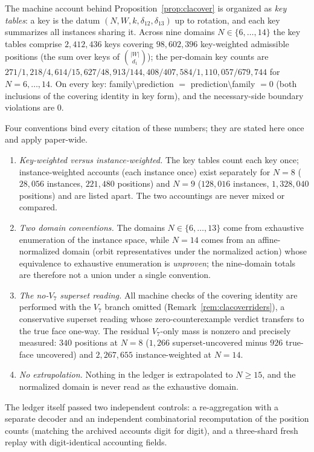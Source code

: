 The machine account behind Proposition~\ref{prop:clacover} is organized as
\emph{key tables}: a key is the datum $(N,W,k,\delta_{12},\delta_{13})$ up
to rotation, and each key summarizes all instances sharing it. Across nine
domains $N\in\{6,\dots,14\}$ the key tables comprise $2{,}412{,}436$ keys
covering $98{,}602{,}396$ key-weighted admissible positions (the sum over
keys of $\binom{|W|}{d_1}$); the per-domain key counts are
$271/1{,}218/4{,}614/15{,}627/48{,}913/144{,}408/407{,}584/1{,}110{,}057/679{,}744$
for $N=6,\dots,14$. On every key: family$\setminus$prediction $=$
prediction$\setminus$family $=0$ (both inclusions of the covering identity
in key form), and the necessary-side boundary violations are $0$.

Four conventions bind every citation of these numbers; they are stated
here once and apply paper-wide.

\begin{enumerate}[label=\textup{(\arabic*)},leftmargin=2em]
\item \emph{Key-weighted versus instance-weighted.} The key tables count
each key once; instance-weighted accounts (each instance once) exist
separately for $N=8$ ($28{,}056$ instances, $221{,}480$ positions) and $N=9$
($128{,}016$ instances, $1{,}328{,}040$ positions) and are listed apart.
The two accountings are never mixed or compared.
\item \emph{Two domain conventions.} The domains $N\in\{6,\dots,13\}$ come
from exhaustive enumeration of the instance space, while $N=14$ comes from
an affine-normalized domain (orbit representatives under the normalized
action) whose equivalence to exhaustive enumeration is \emph{unproven}; the
nine-domain totals are therefore not a union under a single convention.
\item \emph{The no-$V_7$ superset reading.} All machine checks of the
covering identity are performed with the $V_7$ branch omitted
(Remark~\ref{rem:clacoverriders}), a conservative superset reading whose
zero-counterexample verdict transfers to the true face one-way. The residual
$V_7$-only mass is nonzero and precisely measured: $340$ positions at $N=8$
($1{,}266$ superset-uncovered minus $926$ true-face uncovered) and
$2{,}267{,}655$ instance-weighted at $N=14$.
\item \emph{No extrapolation.} Nothing in the ledger is extrapolated to
$N\ge15$, and the normalized domain is never read as the exhaustive domain.
\end{enumerate}

The ledger itself passed two independent controls: a re-aggregation with a
separate decoder and an independent combinatorial recomputation of the
position counts (matching the archived accounts digit for digit), and a
three-shard fresh replay with digit-identical accounting fields.

